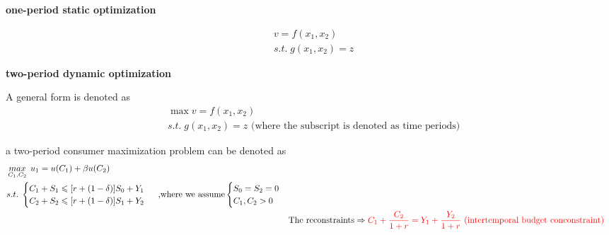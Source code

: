 \documentclass{article}
\begin{document}
\textbf{one-period static optimization} 

\begin{equation}
\begin{split}
&v=f(x_{1},x_{2})
\\&s.t. \; g(x_{1},x_{2})=z
\end{split}
\end{equation}



\textbf{two-period dynamic optimization} 

A general form is denoted as
\begin{equation}
\begin{split}
&\max v=f(x_1,x_2)
\\&s.t. \; g(x_{1},x_{2})=z \text{ (where the subscript is denoted as time periods)}
\end{split}
\end{equation}


a two-period consumer maximization problem can be denoted as
\begin{align}
\begin{split}
&\mathop{max}_{C_{1},C_{2}} \; u_{1}=u(C_{1})+\beta u(C_{2})
\\&s.t. \; \begin{cases}
C_{1}+S_{1}\leqslant [r+(1-\delta)]S_{0} +Y_{1} \\
C_{2}+S_{2}\leqslant [r+(1-\delta)]S_{1}+Y_{2}\end{cases}\text{ ,where we assume}\begin{cases}
S_{0}=S_{2}=0 \\
C_{1},C_{2}>0\end{cases} 
\end{split}
\\& \text{The reconstraints}\Rightarrow \color{red} C_{1}+\frac{C_{2}}{1+r}=Y_{1}+\frac{Y_{2}}{1+r} \text{ (intertemporal budget conconstraint)}
\end{align}
\end{document}
